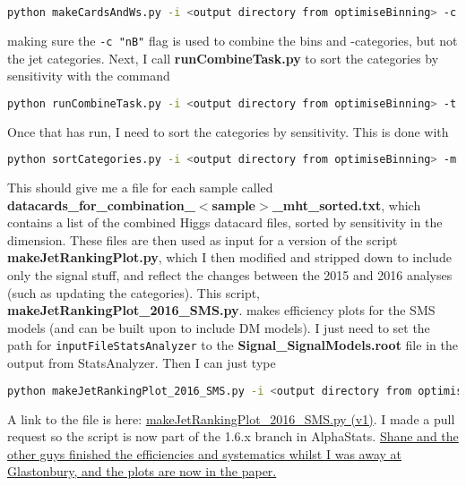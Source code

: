 \begin{lstlisting}[belowskip=-0.7cm, language=sh, numbers=none]
python makeCardsAndWs.py -i <output directory from optimiseBinning> -c "nB"
\end{lstlisting}

making sure the \verb!-c "nB"! flag is used to combine the \HT bins and \Pqb-categories, but not the jet categories. Next, I call \textbf{runCombineTask.py} to sort the categories by sensitivity with the command

\begin{lstlisting}[belowskip=-0.7cm, language=sh, numbers=none]
python runCombineTask.py -i <output directory from optimiseBinning> -t ASCLS_UL_PRIOR --what expected
\end{lstlisting}

Once that has run, I need to sort the \njet categories by sensitivity. This is done with

\begin{lstlisting}[belowskip=-0.7cm, language=sh, numbers=none]
python sortCategories.py -i <output directory from optimiseBinning> -m ul -c "nB"
\end{lstlisting}

This should give me a file for each sample called \textbf{datacards\_for\_combination\_$<$sample$>$\_mht\_sorted.txt}, which contains a list of the combined Higgs datacard files, sorted by sensitivity in the \njet dimension. These files are then used as input for a version of the script \textbf{makeJetRankingPlot.py}, which I then modified and stripped down to include only the signal stuff, and reflect the changes between the 2015 and 2016 analyses (such as updating the \njet categories). This script, \textbf{makeJetRankingPlot\_2016\_SMS.py}. makes efficiency plots for the SMS models (and can be built upon to include DM models). I just need to set the path for \verb!inputFileStatsAnalyzer! to the \textbf{Signal\_SignalModels.root} file in the output from StatsAnalyzer. Then I can just type

\begin{lstlisting}[belowskip=-0.7cm, language=sh, numbers=none]
python makeJetRankingPlot_2016_SMS.py -i <output directory from optimiseBinning> -o <output directory for efficiency plots>
\end{lstlisting}

A link to the file is here: \href{run:sec23/makeJetRankingPlot_2016_SMSv1.py}{makeJetRankingPlot\_2016\_SMS.py (v1)}. I made a pull request so the script is now part of the 1.6.x branch in AlphaStats. \uline{Shane and the other guys finished the efficiencies and systematics whilst I was away at Glastonbury, and the plots are now in the paper.}


